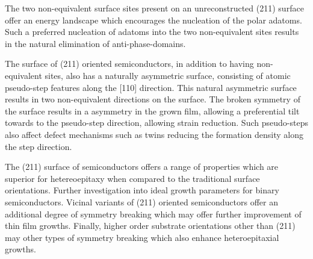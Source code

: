 The two non-equivalent surface sites present on an unreconstructed (211) surface offer an energy landscape which encourages the nucleation of the polar adatoms. Such a preferred nucleation of adatoms into the two non-equivalent sites results in the natural elimination of anti-phase-domains.

The surface of (211) oriented semiconductors, in addition to having non-equivalent sites, 
also has a naturally asymmetric surface, consisting of atomic pseudo-step features along 
the [110] direction. This natural asymmetric surface results in two non-equivalent 
directions on the surface. The broken symmetry of the surface results in a asymmetry in 
the grown film, allowing a preferential tilt towards to the pseudo-step direction, 
allowing strain reduction. Such pseudo-steps also affect defect mechanisms such as twins 
reducing the formation density along the step direction.

The (211) surface of semiconductors offers a range of properties which are superior for 
hetereoepitaxy when compared to the traditional surface orientations. Further 
investigation into ideal growth parameters for binary semiconductors. Vicinal variants of 
(211) oriented semiconductors offer an additional degree of symmetry breaking which may 
offer further improvement of thin film growths. Finally, higher order substrate 
orientations other than (211) may other types of symmetry breaking which also enhance 
heteroepitaxial growths.
